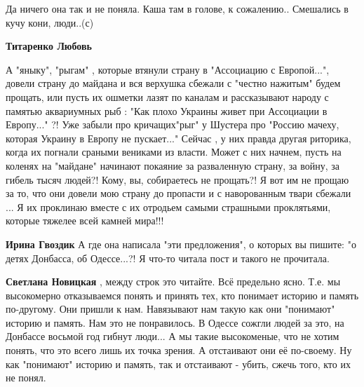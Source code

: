 \begin{itemize}
\begin{itemize}
Да ничего она так и не поняла. Каша там в голове, к сожалению.. Смешались в кучу кони, люди..(с)

 
\textbf{Титаренко Любовь} 

А "яныку", "рыгам" , которые втянули страну в
"Ассоциацию с Европой...", довели страну до майдана и вся верхушка сбежали с
"честно нажитым" будем прощать, или пусть их ошметки лазят по каналам и
рассказывают народу с памятью аквариумных рыб : "Как плохо Украины живет при
Ассоциации в Европу..." ?! Уже забыли про кричащих"рыг" у Шустера про "Россию
мачеху, которая Украину в Европу не пускает..." Сейчас , у них правда другая
риторика, когда их погнали сраными вениками из власти. Может с них начнем,
пусть на коленях на "майдане" начинают покаяние за разваленную страну, за
войну, за гибель тысяч людей?! Кому, вы, собираетесь не прощать?! Я вот им не
прощаю за то, что они довели мою страну до пропасти и с наворованным твари
сбежали ... Я их проклинаю вместе с их отродьем самыми страшными проклятьями,
которые тяжелее всей камней мира!!!

 
\textbf{Ирина Гвоздик} А где она написала "эти предложения", о которых вы
пишите: "о детях Донбасса, об Одессе...?! Я что-то читала пост и такого не
прочитала.

 
\textbf{Светлана Новицкая} , между строк это читайте. Всё предельно ясно. Т.е.
мы высокомерно отказываемся понять и принять тех, кто понимает историю и память
по-другому. Они пришли к нам. Навязывают нам такую как они "понимают" историю и
память. Нам это не понравилось. В Одессе сожгли людей за это, на Донбассе
восьмой год гибнут люди... А мы такие высокоменые, что не хотим понять, что это
всего лишь их точка зрения. А отстаивают они её по-своему. Ну как "понимают"
историю и память, так и отстаивают - убить, сжечь того, кто их не понял.


\end{itemize}
\end{itemize}
